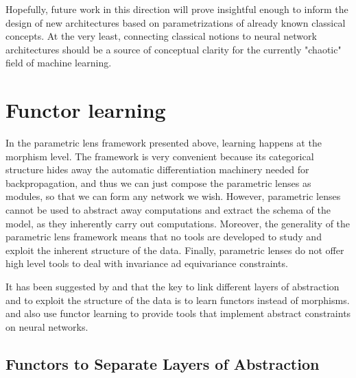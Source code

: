 \documentclass[12pt,a4paper,openright,twoside]{report}
\theoremstyle{plain}
\theoremstyle{definition}
\begin{document}
Hopefully, future work in this direction will prove insightful enough to inform the design of new architectures based on parametrizations of already known classical concepts. At the very least, connecting classical notions to neural network architectures should be a source of conceptual clarity for the currently "chaotic" field of machine learning.



\subsubsection{}












\section{Functor learning}

In the parametric lens framework presented above, learning happens at the morphism level. The framework is very convenient because its categorical structure hides away the automatic differentiation machinery needed for backpropagation, and thus we can just compose the parametric lenses as modules, so that we can form any network we wish. However, parametric lenses cannot be used to abstract away computations and extract the schema of the model, as they inherently carry out computations. Moreover, the generality of the parametric lens framework means that no tools are developed to study and exploit the inherent structure of the data. Finally, parametric lenses do not offer high level tools to deal with invariance ad equivariance constraints. 

It has been suggested by \cite{gavranovic2019compositional} and \cite{sheshmani2021categorical} that the key to link different layers of abstraction and to exploit the structure of the data is to learn functors instead of morphisms. \cite{gavranovic2019compositional} and \cite{vaswani2017attention} also use functor learning to provide tools that implement abstract constraints on neural networks.



\subsection{Functors to Separate Layers of Abstraction}
\end{document}
